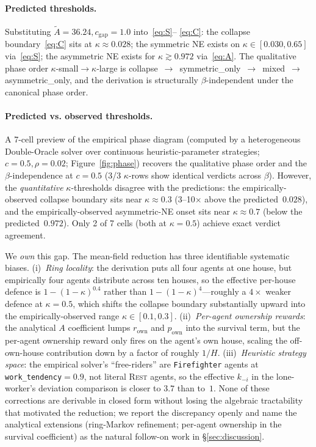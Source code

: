 \documentclass{anvil-paper}
\begin{document}
\paragraph{Predicted thresholds.}
Substituting $\tilde A{=}36.24,c_{\text{gap}}{=}1.0$ into~\eqref{eq:S}--%
\eqref{eq:C}: the collapse boundary~\eqref{eq:C} sits at
$\kappa\approx 0.028$; the symmetric NE exists on
$\kappa\in[0.030,0.65]$ via~\eqref{eq:S}; the asymmetric NE exists for
$\kappa\gtrsim 0.972$ via~\eqref{eq:A}. The qualitative phase order
$\kappa$-small$\to$$\kappa$-large is
\textsf{collapse}~$\to$~\textsf{symmetric\_only}~$\to$~\textsf{mixed}~$\to$~%
\textsf{asymmetric\_only}, and the derivation is structurally
$\beta$-independent under the canonical phase order.

\paragraph{Predicted vs. observed thresholds.}
A 7-cell preview of the empirical phase diagram (computed by a heterogeneous
Double-Oracle solver over continuous heuristic-parameter
strategies; $c{=}0.5,\rho{=}0.02$; Figure~\ref{fig:phase}) recovers the
qualitative phase order and the $\beta$-independence at $c{=}0.5$
(3/3 $\kappa$-rows show identical verdicts across $\beta$). However, the
\emph{quantitative} $\kappa$-thresholds disagree with the predictions: the
empirically-observed collapse boundary sits near $\kappa\approx 0.3$ (3--10$\times$
above the predicted~$0.028$), and the empirically-observed
asymmetric-NE onset sits near $\kappa\approx 0.7$ (below the predicted~$0.972$).
Only 2 of 7 cells (both at $\kappa{=}0.5$) achieve exact verdict agreement.

We \emph{own} this gap. The mean-field reduction has three identifiable
systematic biases. (i)~\emph{Ring locality}: the derivation puts all four
agents at one house, but empirically four agents distribute across ten
houses, so the effective per-house defence is $1{-}(1{-}\kappa)^{0.4}$ rather
than $1{-}(1{-}\kappa)^4$---roughly a $4\times$ weaker defence at $\kappa{=}0.5$,
which shifts the collapse boundary substantially upward into the
empirically-observed range $\kappa\in[0.1,0.3]$. (ii)~\emph{Per-agent
ownership rewards}: the analytical $A$ coefficient lumps $r_{\text{own}}$
and $p_{\text{own}}$ into the survival term, but the per-agent ownership
reward only fires on the agent's own house, scaling the off-own-house
contribution down by a factor of roughly $1/H$. (iii)~\emph{Heuristic
strategy space}: the empirical solver's ``free-riders'' are
\texttt{Firefighter} agents at \texttt{work\_tendency}${=}0.9$, not literal
\textsc{Rest} agents, so the effective $k_{-i}$ in the lone-worker's
deviation comparison is closer to $3.7$ than to~$1$. None of these
corrections are derivable in closed form without losing the algebraic
tractability that motivated the reduction; we report the discrepancy openly
and name the analytical extensions (ring-Markov refinement; per-agent
ownership in the survival coefficient) as the natural follow-on work in
\S\ref{sec:discussion}.
\end{document}
